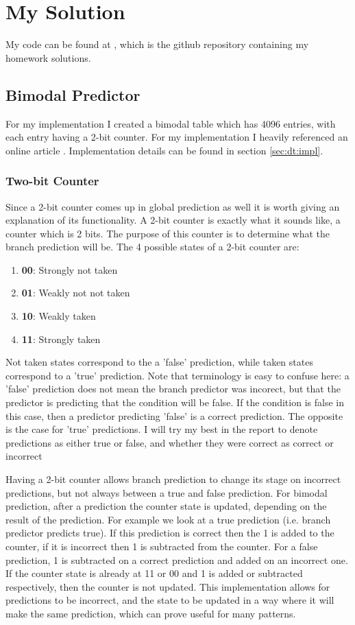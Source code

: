 \documentclass[12pt, twocolumn]{article}
\begin{document}
\section{My Solution}
My code can be found at \cite{CA_github}, which is the github repository containing my homework solutions. 
\subsection{Bimodal Predictor}
For my implementation I created a bimodal table which has 4096 entries, with each entry having a 2-bit counter. For my implementation I heavily referenced an online article \cite{medium_bimodal_branch_predictor}. Implementation details can be found in section \ref{sec:dt:impl}.
\subsubsection{Two-bit Counter} \label{sec:twobc}
Since a 2-bit counter comes up in global prediction as well it is worth giving an explanation of its functionality. A 2-bit counter is exactly what it sounds like, a counter which is 2 bits. The purpose of this counter is to determine what the branch prediction will be. The 4 possible states of a 2-bit counter are:
\begin{enumerate}[nosep]
  \item[] \textbf{00}: Strongly not taken
  \item[] \textbf{01}: Weakly not not taken
  \item[] \textbf{10}: Weakly taken
  \item[] \textbf{11}: Strongly taken
\end{enumerate}
Not taken states correspond to the a 'false' prediction, while taken states correspond to a 'true' prediction. Note that terminology is easy to confuse here: a 'false' prediction does not mean the branch predictor was incorect, but that the predictor is predicting that the condition will be false. If the condition is false in this case, then a predictor predicting 'false' is a correct prediction. The opposite is the case for 'true' predictions. I will try my best in the report to denote predictions as either true or false, and whether they were correct as correct or incorrect

Having a 2-bit counter allows branch prediction to change its stage on incorrect predictions, but not always between a true and false prediction. For bimodal prediction, after a prediction the counter state is updated, depending on the result of the prediction. For example we look at a true prediction (i.e. branch predictor predicts true). If this prediction is correct then the 1 is added to the counter, if it is incorrect then 1 is subtracted from the counter. For a false prediction, 1 is subtracted on a correct prediction and added on an incorrect one. If the counter state is already at 11 or 00 and 1 is added or subtracted respectively, then the counter is not updated. This implementation allows for predictions to be incorrect, and the state to be updated in a way where it will make the same prediction, which can prove useful for many patterns.
\end{document}
